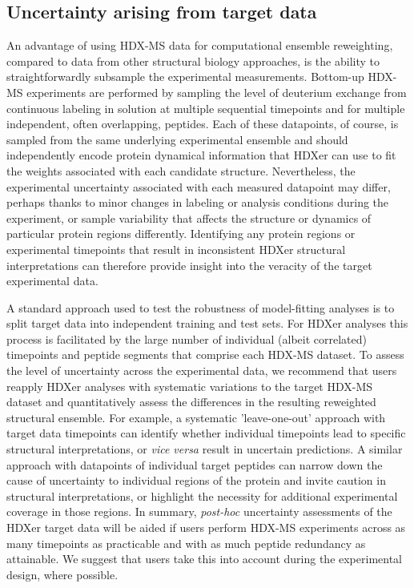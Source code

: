 \documentclass[9pt,tutorial,ASAPversion]{livecoms}
\begin{document}
\subsection{Uncertainty arising from target data}\label{target_data_uncertainty_sect}
An advantage of using HDX-MS data for computational ensemble reweighting, compared to data from other structural biology approaches, is the ability to straightforwardly subsample the experimental measurements.
Bottom-up HDX-MS experiments are performed by sampling the level of deuterium exchange from continuous labeling in solution at multiple sequential timepoints and for multiple independent, often overlapping, peptides.
Each of these datapoints, of course, is sampled from the same underlying experimental ensemble and should independently encode protein dynamical information that HDXer can use to fit the weights associated with each candidate structure.
Nevertheless, the experimental uncertainty associated with each measured datapoint may differ, perhaps thanks to minor changes in labeling or analysis conditions during the experiment, or sample variability that affects the structure or dynamics of particular protein regions differently.
Identifying any protein regions or experimental timepoints that result in inconsistent HDXer structural interpretations can therefore provide insight into the veracity of the target experimental data.

A standard approach used to test the robustness of model-fitting analyses is to split target data into independent training and test sets.
For HDXer analyses this process is facilitated by the large number of individual (albeit correlated) timepoints and peptide segments that comprise each HDX-MS dataset.
To assess the level of uncertainty across the experimental data, we recommend that users reapply HDXer analyses with systematic variations to the target HDX-MS dataset and quantitatively assess the differences in the resulting reweighted structural ensemble. 
For example, a systematic 'leave-one-out' approach with target data timepoints can identify whether individual timepoints lead to specific structural interpretations, or \textit{vice versa} result in uncertain predictions.
A similar approach with datapoints of individual target peptides can narrow down the cause of uncertainty to individual regions of the protein and invite caution in structural interpretations, or highlight the necessity for additional experimental coverage in those regions.
In summary, \textit{post-hoc} uncertainty assessments of the HDXer target data will be aided if users perform HDX-MS experiments across as many timepoints as practicable and with as much peptide redundancy as attainable.
We suggest that users take this into account during the experimental design, where possible.
\end{document}
